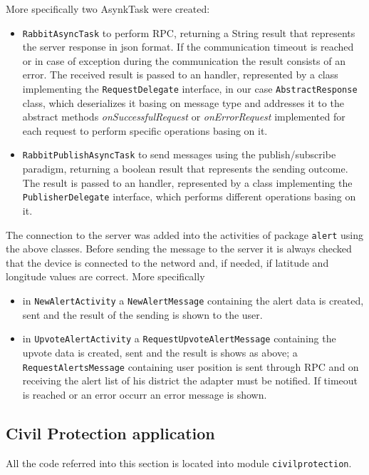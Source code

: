 \documentclass[a4paper,12pt]{report}
\begin{document}
More specifically two AsynkTask were created:
\begin{itemize}
 \item \texttt{RabbitAsyncTask} to perform RPC, returning a String result that represents the server response in json format. If the communication timeout is reached or in case of exception during the communication the result consists of an error. The received result is passed to an handler, represented by a class implementing the \texttt{RequestDelegate} interface, in our case \texttt{AbstractResponse} class, which deserializes it basing on message type and addresses it to the abstract methods \textit{onSuccessfulRequest} or \textit{onErrorRequest} implemented for each request to perform specific operations basing on it.
 \item \texttt{RabbitPublishAsyncTask} to send messages using the publish/subscribe paradigm, returning a boolean result that represents the sending outcome. The result is passed to an handler, represented by a class implementing the \texttt{PublisherDelegate} interface, which performs different operations basing on it.
\end{itemize}
The connection to the server was added into the activities of package \texttt{alert} using the above classes. Before sending the message to the server it is always checked that the device is connected to the netword and, if needed, if latitude and longitude values are correct. More specifically
\begin{itemize}
 \item in \texttt{NewAlertActivity} a \texttt{NewAlertMessage} containing the alert data is created, sent and the result of the sending is shown to the user.
 \item in \texttt{UpvoteAlertActivity} a \texttt{RequestUpvoteAlertMessage} containing the upvote data is created, sent and the result is shows as above; a \texttt{RequestAlertsMessage} containing user position is sent through RPC and on receiving the alert list of his district the adapter must be notified. If timeout is reached or an error occurr an error message is shown. 
\end{itemize}

\subsection{Civil Protection application}

All the code referred into this section is located into module \texttt{civilprotection}.
\end{document}

